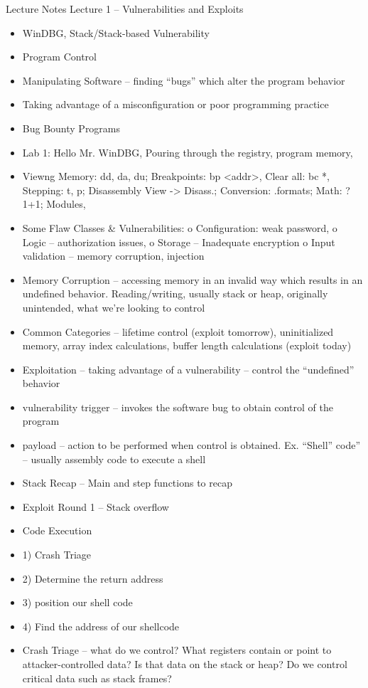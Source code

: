 \documentclass[12pt]{article}
\begin{document}
\newpage
Lecture Notes
\newline
Lecture 1 – Vulnerabilities and Exploits
\begin{itemize}
\item WinDBG, Stack/Stack-based Vulnerability
\item Program Control
\item Manipulating Software – finding “bugs” which alter the program behavior
\item Taking advantage of a misconfiguration or poor programming practice
\item Bug Bounty Programs
\item Lab 1: Hello Mr. WinDBG, Pouring through the registry, program memory,  
\item Viewng Memory: dd, da, du; Breakpoints: bp <addr>, Clear all: bc *, Stepping: t, p; Disassembly View -> Disass.; Conversion: .formats; Math: ?1+1; Modules, 
\item Some Flaw Classes & Vulnerabilities: 
o	Configuration: weak password,
o	Logic – authorization issues,
o	Storage – Inadequate encryption
o	Input validation – memory corruption, injection
\item Memory Corruption – accessing memory in an invalid way which results in an undefined behavior. Reading/writing, usually stack or heap, originally unintended, what we’re looking to control
\item Common Categories – lifetime control (exploit tomorrow), uninitialized memory, array index calculations, buffer length calculations (exploit today)
\item Exploitation – taking advantage of a vulnerability – control the “undefined” behavior
\item vulnerability trigger – invokes the software bug to obtain control of the program
\item payload – action to be performed when control is obtained. Ex. “Shell” code” – usually assembly code to execute a shell
\item Stack Recap – Main and step functions to recap 
\item Exploit Round 1 – Stack overflow
\item Code Execution
\item 1) Crash Triage
\item 2) Determine the return address
\item 3) position our shell code
\item 4) Find the address of our shellcode
\item Crash Triage – what do we control? What registers contain or point to attacker-controlled data? Is that data on the stack or heap? Do we control critical data such as stack frames?

\end{itemize}
\end{document}
